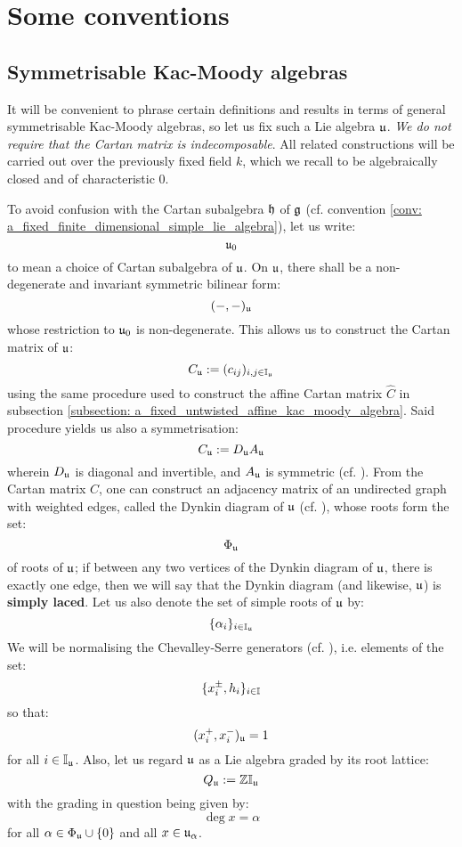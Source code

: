 \section{Some conventions}
    \subsection{Symmetrisable Kac-Moody algebras} \label{subection: a_fixed_symmetrisable_kac_moody_algebra}
        It will be convenient to phrase certain definitions and results in terms of general symmetrisable Kac-Moody algebras, so let us fix such a Lie algebra $\mathfrak{u}$. \textit{We do not require that the Cartan matrix is indecomposable}. All related constructions will be carried out over the previously fixed field $k$, which we recall to be algebraically closed and of characteristic $0$. 

        To avoid confusion with the Cartan subalgebra $\mathfrak{h}$ of $\mathfrak{g}$ (cf. convention \ref{conv: a_fixed_finite_dimensional_simple_lie_algebra}), let us write:
            $$\mathfrak{u}_0$$
        to mean a choice of Cartan subalgebra of $\mathfrak{u}$. On $\mathfrak{u}$, there shall be a non-degenerate and invariant symmetric bilinear form:
            $$(-, -)_{\mathfrak{u}}$$
        whose restriction to $\mathfrak{u}_0$ is non-degenerate. This allows us to construct the Cartan matrix of $\mathfrak{u}$:
            $$C_{\mathfrak{u}} := (c_{ij})_{i, j \in \mathbb{I}_{\mathfrak{u}}}$$
        using the same procedure used to construct the affine Cartan matrix $\hat{C}$ in subsection \ref{subsection: a_fixed_untwisted_affine_kac_moody_algebra}. Said procedure yields us also a symmetrisation:
            $$C_{\mathfrak{u}} := D_{\mathfrak{u}} A_{\mathfrak{u}}$$
        wherein $D_{\mathfrak{u}}$ is diagonal and invertible, and $A_{\mathfrak{u}}$ is symmetric (cf. \cite[Chapter 2]{kac_infinite_dimensional_lie_algebras}). From the Cartan matrix $C$, one can construct an adjacency matrix of an undirected graph with weighted edges, called the Dynkin diagram of $\mathfrak{u}$ (cf. \cite[Section 4.7]{kac_infinite_dimensional_lie_algebras}), whose roots form the set:
            $$\Phi_{\mathfrak{u}}$$
        of roots of $\mathfrak{u}$; if between any two vertices of the Dynkin diagram of $\mathfrak{u}$, there is exactly one edge, then we will say that the Dynkin diagram (and likewise, $\mathfrak{u}$) is \textbf{simply laced}. Let us also denote the set of simple roots of $\mathfrak{u}$ by:
            $$\{\alpha_i\}_{i \in \mathbb{I}_{\mathfrak{u}}}$$
        We will be normalising the Chevalley-Serre generators (cf. \cite[Theorem 1.4]{kac_infinite_dimensional_lie_algebras}), i.e. elements of the set:
            $$\{x_i^{\pm}, h_i\}_{i \in \mathbb{I}}$$
        so that:
            $$(x_i^+, x_i^-)_{\mathfrak{u}} = 1$$
        for all $i \in \mathbb{I}_{\mathfrak{u}}$. Also, let us regard $\mathfrak{u}$ as a Lie algebra graded by its root lattice:
            $$Q_{\mathfrak{u}} := \mathbb{Z}\mathbb{I}_{\mathfrak{u}}$$
        with the grading in question being given by:
            $$\deg x = \alpha$$
        for all $\alpha \in \Phi_{\mathfrak{u}} \cup \{0\}$ and all $x \in \mathfrak{u}_{\alpha}$.
        
